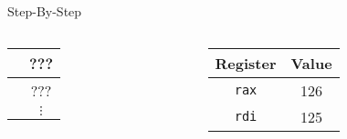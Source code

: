 \documentclass[hyphens,aspectratio=169]{beamer}
\begin{document}
\begin{frame}[fragile]{Step-By-Step}
\begin{columns}
\begin{column}{0.33\textwidth}
{\begin{tabular}{c|c|}
                \hline
                & ??? \\
                \hline
                & ??? \\
                \hline
                & $\vdots$
            \end{tabular}}
        \end{column}
        \begin{column}{0.33\textwidth}
            \begin{tabular}{| c | c |}
                \hline
                Register & Value \\
                \hline
                \texttt{rax} & 126 \\
                \hline
                \texttt{rdi} & 125 \\
                \hline
            \end{tabular}
        \end{column}
    \end{columns}
\end{frame}
\end{document}

